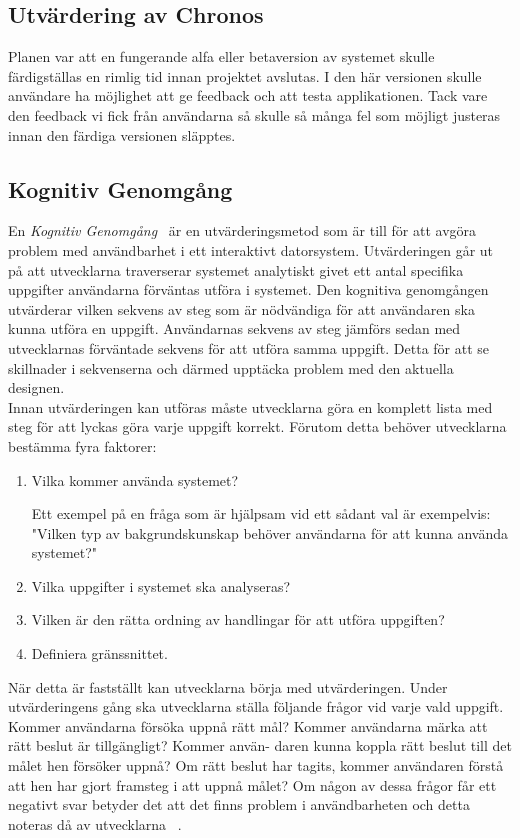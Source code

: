 \documentclass[a4paper, 11pt]{article}
\begin{document}
\subsection{Utvärdering av Chronos}
Planen var att en fungerande alfa eller betaversion av systemet skulle färdigställas en rimlig tid innan projektet avslutas. I den här versionen skulle användare ha möjlighet att ge feedback och att testa applikationen. Tack vare den feedback vi fick från användarna så skulle så många fel som möjligt justeras innan den färdiga versionen släpptes.



\subsection{Kognitiv Genomgång}
En \textit{Kognitiv Genomgång}~\cite[sid 2--8]{cognitive} är en utvärderingsmetod som är till för att avgöra problem med användbarhet i ett interaktivt datorsystem. Utvärderingen går ut på att utvecklarna traverserar systemet analytiskt givet ett antal specifika uppgifter användarna förväntas utföra i systemet. Den kognitiva genomgången utvärderar vilken sekvens av steg som är nödvändiga för att användaren ska kunna utföra en uppgift. Användarnas sekvens av steg jämförs sedan med utvecklarnas förväntade sekvens för att utföra samma uppgift. Detta för att se skillnader i sekvenserna och därmed upptäcka problem med den aktuella designen.\\
Innan utvärderingen kan utföras måste utvecklarna göra en komplett lista med steg för att lyckas göra varje uppgift korrekt. Förutom detta behöver utvecklarna bestämma fyra faktorer:
\begin{enumerate}
\item Vilka kommer använda systemet?

Ett exempel på en fråga som är hjälpsam vid ett sådant val är exempelvis: "Vilken typ av bakgrundskunskap behöver användarna för att kunna använda systemet?"
\item Vilka uppgifter i systemet ska analyseras?
\item Vilken är den rätta ordning av handlingar för att utföra uppgiften?
\item Definiera gränssnittet.
\end{enumerate}

När detta är fastställt kan utvecklarna börja med utvärderingen. Under utvärderingens gång ska utvecklarna ställa följande frågor vid varje vald uppgift. Kommer användarna försöka uppnå rätt mål? Kommer användarna märka att rätt beslut är tillgängligt? Kommer använ-
daren kunna koppla rätt beslut till det målet hen försöker uppnå? Om rätt beslut har tagits, kommer användaren förstå att hen har gjort framsteg i att uppnå målet?
Om någon av dessa frågor får ett negativt svar betyder det att det finns problem i användbarheten och detta noteras då av utvecklarna ~\cite[sid 230--232]{benyon2010designing}.
\end{document}
